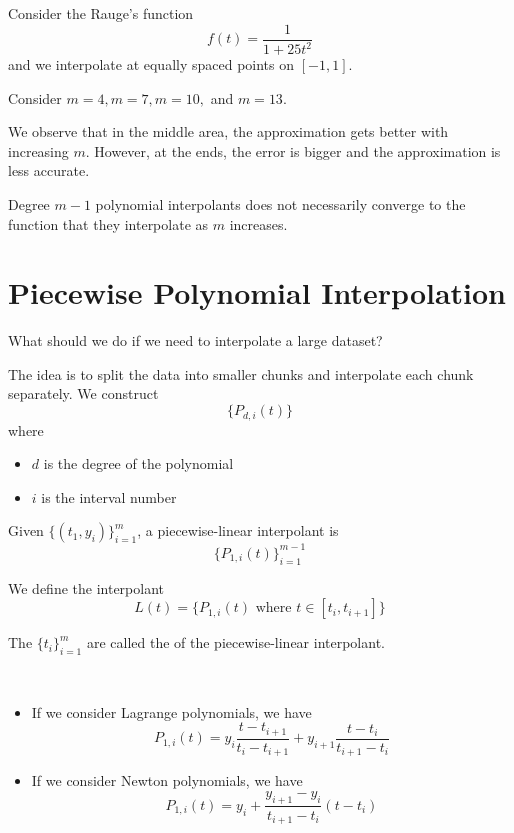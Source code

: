 \begin{example}
    Consider the Rauge's function \[
        f(t) = \frac{1}{1 + 25t^2}
    \] and we interpolate at equally spaced points on \( [-1, 1] \).

    Consider \( m = 4, m = 7, m = 10, \) and \( m = 13 \).


    We observe that in the middle area, the approximation gets better with increasing \( m \). However, at the ends, the error is bigger and the approximation is less accurate.
\end{example}

\begin{remark}
    Degree \( m - 1 \) polynomial interpolants does not necessarily converge to the function that they interpolate as \( m \) increases.
\end{remark}

\section{Piecewise Polynomial Interpolation}

What should we do if we need to interpolate a large dataset?

The idea is to split the data into smaller chunks and interpolate each chunk separately. We construct  \[
    \{ P_{d,i}(t) \}
\] where
\begin{itemize}
    \item \( d \) is the degree of the polynomial
    \item \( i \) is the interval number
\end{itemize}

\begin{example}
    Given \( \{ (t_1, y_i ) \}_{i=1}^{m} \), a piecewise-linear interpolant is \[
        \{ P_{1,i}(t) \}_{i=1}^{m-1}
    \]

    We define the interpolant \[
        L(t) = \{ P_{1,i}(t) \text{ where } t \in [t_i, t_{i+1}] \}
    \]

    The \( \{ t_i \}_{i=1}^{m} \) are called the  of the piecewise-linear interpolant.

        {~~~}

    \begin{itemize}
        \item If we consider Lagrange polynomials, we have \[
                  P_{1,i}(t) = y_i \frac{t-t_{i+1}}{t_i - t_{i+1}} + y_{i+1} \frac{t-t_i}{t_{i+1} - t_i}
              \]

        \item If we consider Newton polynomials, we have \[
                  P_{1,i}(t) = y_i + \frac{y_{i+1} - y_i}{t_{i+1} - t_i} (t - t_i)
              \]
    \end{itemize}
\end{example}

